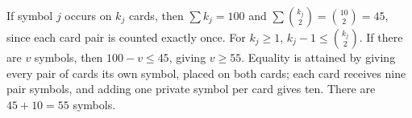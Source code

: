If symbol $j$ occurs on $k_j$ cards, then $\sum k_j=100$ and $\sum\binom{k_j}{2}=\binom{10}{2}=45$, since each card pair is counted exactly once. For $k_j\ge1$, $k_j-1\le\binom{k_j}{2}$. If there are $v$ symbols, then $100-v\le45$, giving $v\ge55$. Equality is attained by giving every pair of cards its own symbol, placed on both cards; each card receives nine pair symbols, and adding one private symbol per card gives ten. There are $45+10=\boxed{55}$ symbols.

